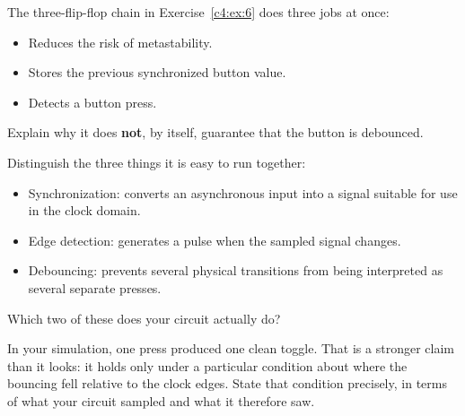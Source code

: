 The three-flip-flop chain in Exercise~\ref{c4:ex:6} does three jobs at once:
\begin{itemize}
  \item Reduces the risk of metastability.
  \item Stores the previous synchronized button value.
  \item Detects a button press.
\end{itemize}
Explain why it does \textbf{not}, by itself, guarantee that the button is debounced.

\begin{parts}
  \item Distinguish the three things it is easy to run together:
    \begin{itemize}
      \item Synchronization: converts an asynchronous input into a signal suitable for use in the
        clock domain.
      \item Edge detection: generates a pulse when the sampled signal changes.
      \item Debouncing: prevents several physical transitions from being interpreted as several
        separate presses.
    \end{itemize}
    Which two of these does your circuit actually do?
  \item In your simulation, one press produced one clean toggle. That is a stronger claim than it
    looks: it holds only under a particular condition about where the bouncing fell relative to the
    clock edges. State that condition precisely, in terms of what your circuit sampled and what it
    therefore saw.


\end{parts}
